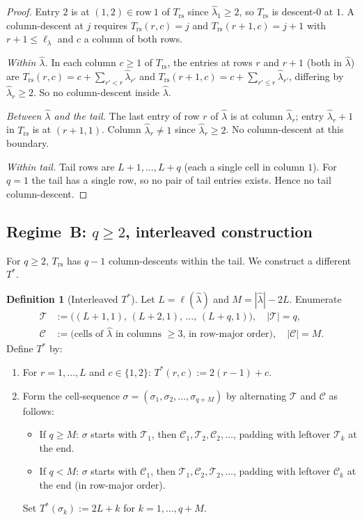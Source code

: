 \documentclass[11pt]{article}
\theoremstyle{definition}
\newtheorem{definition}[theorem]{Definition}
\newcommand{\hatl}{\widehat\lambda}
\newcommand{\elh}{\ell(\hatl)}
\newcommand{\Trs}{T_{\mathrm{rs}}}
\newcommand{\Tstar}{T^*}
\begin{document}
\begin{proof}
Entry $2$ is at $(1,2) \in \mathrm{row}\ 1$ of $\Trs$ since
$\hatl_1 \ge 2$, so $\Trs$ is descent-$0$ at $1$.  A column-descent at
$j$ requires $\Trs(r,c) = j$ and $\Trs(r+1,c) = j+1$ with $r+1 \le \ell_\lambda$
and $c$ a column of both rows.

\emph{Within $\hatl$.}  In each column $c \ge 1$ of $\Trs$, the entries
at rows $r$ and $r+1$ (both in $\hatl$) are $\Trs(r,c) = c +
\sum_{r' < r}\hatl_{r'}$ and $\Trs(r+1,c) = c + \sum_{r' \le r}\hatl_{r'}$,
differing by $\hatl_r \ge 2$.  So no column-descent inside $\hatl$.

\emph{Between $\hatl$ and the tail.}  The last entry of row $r$ of
$\hatl$ is at column $\hatl_r$; entry $\hatl_r + 1$ in $\Trs$ is at
$(r+1, 1)$.  Column $\hatl_r \ne 1$ since $\hatl_r \ge 2$.  No
column-descent at this boundary.

\emph{Within tail.}  Tail rows are $L+1, \ldots, L+q$ (each a single
cell in column $1$).  For $q = 1$ the tail has a single row, so no
pair of tail entries exists.  Hence no tail column-descent.
\end{proof}

\subsection{Regime~B: $q \ge 2$, interleaved construction}

For $q \ge 2$, $\Trs$ has $q-1$ column-descents within the tail.  We
construct a different $\Tstar$.

\begin{definition}[Interleaved $\Tstar$]\label{def:interleaved}
Let $L = \elh$ and $M = |\hatl| - 2L$.  Enumerate
\begin{align*}
   \mathcal{T} &:= \bigl((L+1,1),\, (L+2,1),\, \ldots,\, (L+q,1)\bigr),
   \quad |\mathcal{T}| = q,\\
   \mathcal{C} &:= \bigl(\text{cells of $\hatl$ in columns $\ge 3$, in
   row-major order}\bigr), \quad |\mathcal{C}| = M.
\end{align*}
Define $\Tstar$ by:
\begin{enumerate}[label=(\roman*),topsep=2pt,itemsep=2pt]
\item For $r = 1, \ldots, L$ and $c \in \{1, 2\}$: $\Tstar(r, c) := 2(r-1) + c$.
\item Form the cell-sequence $\sigma = (\sigma_1, \sigma_2, \ldots, \sigma_{q+M})$ by
alternating $\mathcal{T}$ and $\mathcal{C}$ as follows:
\begin{itemize}
\item If $q \ge M$: $\sigma$ starts with $\mathcal{T}_1$, then $\mathcal{C}_1, \mathcal{T}_2,
\mathcal{C}_2, \ldots$, padding with leftover $\mathcal{T}_k$ at the end.
\item If $q < M$: $\sigma$ starts with $\mathcal{C}_1$, then $\mathcal{T}_1, \mathcal{C}_2,
\mathcal{T}_2, \ldots$, padding with leftover $\mathcal{C}_k$ at the end (in
row-major order).
\end{itemize}
Set $\Tstar(\sigma_k) := 2L + k$ for $k = 1, \ldots, q + M$.
\end{enumerate}
\end{definition}
\end{document}

